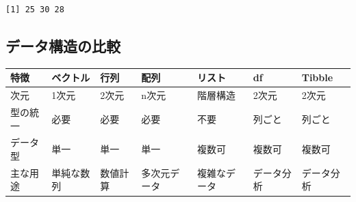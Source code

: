\documentclass[
  a4paper,
]{ltjsbook}
\begin{document}
\begin{verbatim}
[1] 25 30 28
\end{verbatim}

\subsection{データ構造の比較}\label{ux30c7ux30fcux30bfux69cbux9020ux306eux6bd4ux8f03}

\begin{longtable}[]{@{}
  >{\raggedright\arraybackslash}p{}
  >{\raggedright\arraybackslash}p{}
  >{\raggedright\arraybackslash}p{}
  >{\raggedright\arraybackslash}p{}
  >{\raggedright\arraybackslash}p{}
  >{\raggedright\arraybackslash}p{}
  >{\raggedright\arraybackslash}p{}@{}}
\toprule\noalign{}
\begin{minipage}[b]{\linewidth}\raggedright
特徴
\end{minipage} & \begin{minipage}[b]{\linewidth}\raggedright
ベクトル
\end{minipage} & \begin{minipage}[b]{\linewidth}\raggedright
行列
\end{minipage} & \begin{minipage}[b]{\linewidth}\raggedright
配列
\end{minipage} & \begin{minipage}[b]{\linewidth}\raggedright
リスト
\end{minipage} & \begin{minipage}[b]{\linewidth}\raggedright
df
\end{minipage} & \begin{minipage}[b]{\linewidth}\raggedright
Tibble
\end{minipage} \\
\midrule\noalign{}
\endhead
\bottomrule\noalign{}
\endlastfoot
次元 & 1次元 & 2次元 & n次元 & 階層構造 & 2次元 & 2次元 \\
型の統一 & 必要 & 必要 & 必要 & 不要 & 列ごと & 列ごと \\
データ型 & 単一 & 単一 & 単一 & 複数可 & 複数可 & 複数可 \\
主な用途 & 単純な数列 & 数値計算 & 多次元データ & 複雑なデータ &
データ分析 & データ分析 \\
\end{longtable}
\end{document}
